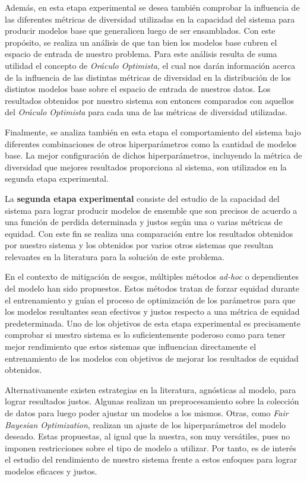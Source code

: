 Además, en esta etapa experimental se desea también comprobar la influencia de las diferentes métricas de diversidad utilizadas en la capacidad del sistema para producir modelos base que generalicen luego de ser ensamblados.
Con este propósito, se realiza un análisis de que tan bien los modelos base cubren el espacio de entrada de nuestro problema.
Para este análisis resulta de suma utilidad el concepto de \emph{Oráculo Optimista}, el cual nos darán información acerca de la influencia de las distintas métricas de diversidad en la distribución de los distintos modelos base sobre el espacio de entrada de nuestros datos.
Los resultados obtenidos por nuestro sistema son entonces comparados con aquellos del \emph{Oráculo Optimista} para cada una de las métricas de diversidad utilizadas.

Finalmente, se analiza también en esta etapa el comportamiento del sistema bajo diferentes combinaciones de otros hiperparámetros como la cantidad de modelos base.
La mejor configuración de dichos hiperparámetros, incluyendo la métrica de diversidad que mejores resultados proporciona al sistema, son utilizados en la segunda etapa experimental.

La \textbf{segunda etapa experimental} consiste del estudio de la capacidad del sistema para lograr producir modelos de ensemble que son precisos de acuerdo a una función de perdida determinada y justos según una o varias métricas de equidad. 
Con este fin se realiza una comparación entre los resultados obtenidos por nuestro sistema y los obtenidos por varios otros sistemas que resultan relevantes en la literatura para la solución de este problema.

En el contexto de mitigación de sesgos, múltiples métodos \emph{ad-hoc} o dependientes del modelo han sido propuestos.
Estos métodos tratan de forzar equidad durante el entrenamiento y guían el proceso de optimización de los parámetros para que los modelos resultantes sean efectivos y justos respecto a una métrica de equidad predeterminada.
Uno de los objetivos de esta etapa experimental es precisamente comprobar si nuestro sistema es lo suficientemente poderoso como para tener mejor rendimiento que estos sistemas que influencian directamente el entrenamiento de los modelos con objetivos de mejorar los resultados de equidad obtenidos.

Alternativamente existen estrategias en la literatura, agnósticas al modelo, para lograr resultados justos.
Algunas realizan un preprocesamiento sobre la colección de datos para luego poder ajustar un modelos a los mismos.
Otras, como \emph{Fair Bayesian Optimization}, realizan un ajuste de los hiperparámetros del modelo deseado.
Estas propuestas, al igual que la nuestra, son muy versátiles, pues no imponen restricciones sobre el tipo de modelo a utilizar.
Por tanto, es de interés el estudio del rendimiento de nuestro sistema frente a estos enfoques para lograr modelos eficaces y justos.

